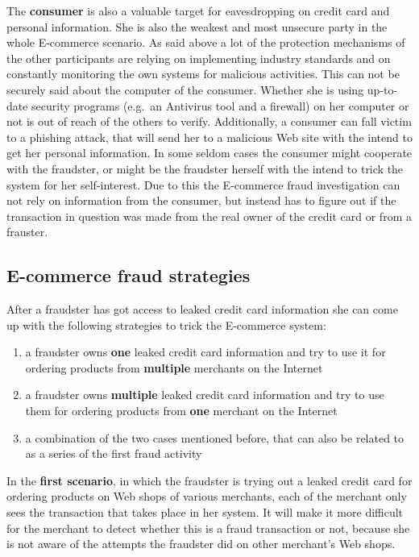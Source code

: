 The \textbf{consumer} is also a valuable target for eavesdropping on credit card and personal information. She is also the weakest and most unsecure party in the whole E-commerce scenario. As said above a lot of the protection mechanisms of the other participants are relying on implementing industry standards and on constantly monitoring the own systems for malicious activities. This can not be securely said about the computer of the consumer. Whether she is using up-to-date security programs (e.g.\ an Antivirus tool and a firewall) on her computer or not is out of reach of the others to verify. Additionally, a consumer can fall victim to a phishing attack, that will send her to a malicious Web site with the intend to get her personal information. In some seldom cases the consumer might cooperate with the fraudster, or might be the fraudster herself with the intend to trick the system for her self-interest. Due to this the E-commerce fraud investigation can not rely on information from the consumer, but instead has to figure out if the transaction in question was made from the real owner of the credit card or from a frauster.


\subsection{E-commerce fraud strategies}
\label{subsec:strategies_fraudster}

After a fraudster has got access to leaked credit card information she can come up with the following strategies to trick the E-commerce system:\@

\begin{enumerate}
  \item a fraudster owns \textbf{one} leaked credit card information and try to use it for ordering products from \textbf{multiple} merchants on the Internet
  \item a fraudster owns \textbf{multiple} leaked credit card information and try to use them for ordering products from \textbf{one} merchant on the Internet
  \item a combination of the two cases mentioned before, that can also be related to as a series of the first fraud activity
\end{enumerate}

In the \textbf{first scenario}, in which the fraudster is trying out a leaked credit card for ordering products on Web shops of various merchants, each of the merchant only sees the transaction that takes place in her system. It will make it more difficult for the merchant to detect whether this is a fraud transaction or not, because she is not aware of the attempts the fraudster did on other merchant's Web shops. \\

